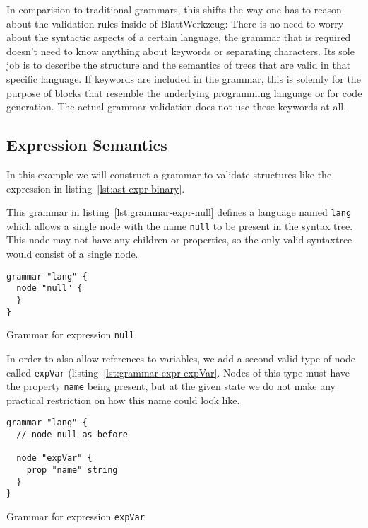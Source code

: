 \documentclass[sigconf,natbib=false,review=true]{acmart}
\begin{document}
In comparision to traditional grammars, this shifts the way one has to reason about the validation rules inside of BlattWerkzeug: There is no need to worry about the syntactic aspects of a certain language, the grammar that is required doesn’t need to know anything about keywords or separating characters. Its sole job is to describe the structure and the semantics of trees that are valid in that specific language. If keywords are included in the grammar, this is solemly for the purpose of blocks that resemble the underlying programming language or for code generation. The actual grammar validation does not use these keywords at all.

\subsection{Expression Semantics}

In this example we will construct a grammar to validate structures like the expression in listing~\ref{lst:ast-expr-binary}.

This grammar in listing~\ref{lst:grammar-expr-null} defines a language named \texttt{lang} which allows a single node with the name \texttt{null} to be present in the syntax tree. This node may not have any children or properties, so the only valid syntaxtree would consist of a single node.

\begin{listing}[H]
\begin{verbatim}
grammar "lang" {
  node "null" {
  }
}
\end{verbatim}
\caption{Grammar for expression \texttt{null}}
\label{lst:grammar-expr-null}
\end{listing}

In order to also allow references to variables, we add a second valid type of node called \texttt{expVar} (listing~\ref{lst:grammar-expr-expVar}. Nodes of this type must have the property \texttt{name} being present, but at the given state we do not make any practical restriction on how this name could look like.

\begin{listing}[H]
\begin{verbatim}
grammar "lang" {
  // node null as before

  node "expVar" {
    prop "name" string
  }
}
\end{verbatim}
\caption{Grammar for expression \texttt{expVar}}
\label{lst:grammar-expr-expVar}
\end{listing}
\end{document}
